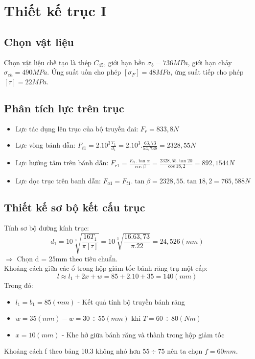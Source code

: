 \section{Thiết kế trục I}
\subsection{Chọn vật liệu}
Chọn vật liệu chế tạo là thép $C_{45}$, giới hạn bền $\sigma_b =736MPa$, giới hạn chảy $\sigma_{ch} = 490MPa$.
Ứng suất uốn cho phép $[\sigma_F] = 48MPa$, ứng suất tiếp cho phép $[\tau] = 22MPa$.
\subsection{Phân tích lực trên trục}
\begin{itemize}
    \item Lực tác dụng lên trục của bộ truyền đai: $F_r = 833,8N$
    \item Lực vòng bánh dẫn: $F_{t1} = 2.10^3\frac{T_1}{d_1} = 2.10^3.\frac{63,73}{54,738} = 2328,55N$
    \item Lực hướng tâm trên bánh dẫn: $F_{r1} = \frac{F_{t1}.\tan\alpha}{\cos\beta} = \frac{2328,55.\tan20}{\cos18,2} = 892,1544N$
    \item Lực dọc trục trên banh dẫn: $F_{a1} = F_{t1}.\tan\beta = 2328,55.\tan18,2 = 765,588N$
\end{itemize}

\subsection{Thiết kế sơ bộ kết cấu trục}
Tính sơ bộ đường kính trục: \\
\[
    d_1 = 10\sqrt[3]{\frac{16T_1}{\pi[\tau]}} = 10\sqrt[3]{\frac{16.63,73}{\pi.22}} = 24,526(mm)
\]
$\Rightarrow$ Chọn d = 25mm theo tiêu chuẩn. \\
Khoảng cách giữa các ổ trong hộp giảm tốc bánh răng trụ một cấp: \\
\[
    l \approx l_1 + 2x + w = 85 + 2.10 + 35 = 140(mm)
\]
Trong đó: 
\begin{itemize}
    \item $l_1 = b_1 = 85(mm)$ - Kết quả tính bộ truyền bánh răng
    \item $w = 35(mm) - w = 30 \div 55(mm)$ khi $T = 60 \div 80(Nm)$
    \item $x = 10(mm)$ - Khe hở giữa bánh răng và thành trong hộp giảm tốc
\end{itemize}
Khoảng cách f theo bảng 10.3 không nhỏ hơn $55 \div 75$ nên ta chọn $f = 60mm.$
